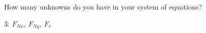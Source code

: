 How many unknowns do you have in your system of equations?

\begin{solution}
    3: $F_{Nx}$, $F_{Ny}$, $F_r$
\end{solution}
